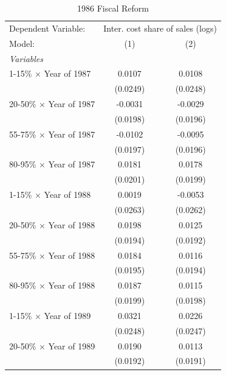 \documentclass[
  12pt]{article}
\theoremstyle{definition}
\theoremstyle{remark}
\begin{document}
\hypertarget{tbl-did-1986}{}
\begingroup
\centering
\begin{table}
\caption{\label{tbl-did-1986}1986 Fiscal Reform }\tabularnewline

\centering
\begin{tabular}{lcc}
   \tabularnewline \midrule \midrule
   Dependent Variable: & \multicolumn{2}{c}{Inter. cost share of sales (logs)}\\
   Model:                          & (1)      & (2)\\  
   \midrule
   \emph{Variables}\\
   1-15\% $\times$ Year of 1987    & 0.0107   & 0.0108\\   
                                   & (0.0249) & (0.0248)\\   
   20-50\% $\times$ Year of 1987   & -0.0031  & -0.0029\\   
                                   & (0.0198) & (0.0196)\\   
   55-75\% $\times$ Year of 1987   & -0.0102  & -0.0095\\   
                                   & (0.0197) & (0.0196)\\   
   80-95\% $\times$ Year of 1987   & 0.0181   & 0.0178\\   
                                   & (0.0201) & (0.0199)\\   
   1-15\% $\times$ Year of 1988    & 0.0019   & -0.0053\\   
                                   & (0.0263) & (0.0262)\\   
   20-50\% $\times$ Year of 1988   & 0.0198   & 0.0125\\   
                                   & (0.0194) & (0.0192)\\   
   55-75\% $\times$ Year of 1988   & 0.0184   & 0.0116\\   
                                   & (0.0195) & (0.0194)\\   
   80-95\% $\times$ Year of 1988   & 0.0187   & 0.0115\\   
                                   & (0.0199) & (0.0198)\\   
   1-15\% $\times$ Year of 1989    & 0.0321   & 0.0226\\   
                                   & (0.0248) & (0.0247)\\   
   20-50\% $\times$ Year of 1989   & 0.0190   & 0.0113\\   
                                   & (0.0192) & (0.0191)\\   

\end{tabular}
\end{table}
\end{document}
